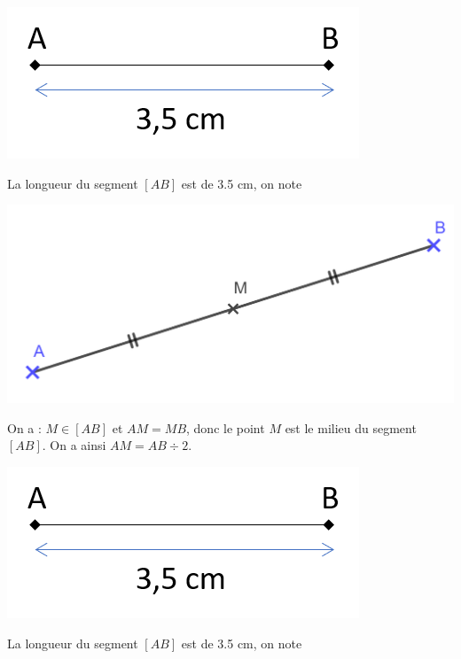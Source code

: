 \documentclass[12pt,a4paper]{article}
\date{}
\title{}
\begin{document}

\begin{myex}
	\vspace*{-0.5cm}
	\begin{center}
		\includegraphics[scale=0.8]{img/lgr}
	\end{center}
	\vspace*{-0.5cm}
	La longueur du segment $[AB]$ est de \num{3.5} cm, on note
\end{myex}


\begin{myex}
	\begin{center}
		\includegraphics[scale=0.25]{img/milieu}
	\end{center}
	
	On a : $M \in [AB]$ et $AM = MB$, donc le point $M$ est le milieu du segment $[AB]$. On a ainsi $AM = AB \div 2$. 
\end{myex}

\begin{myex}
	\vspace*{-0.5cm}
	\begin{center}
		\includegraphics[scale=0.8]{img/lgr}
	\end{center}
	\vspace*{-0.5cm}
	La longueur du segment $[AB]$ est de \num{3.5} cm, on note
\end{myex}
\end{document}
